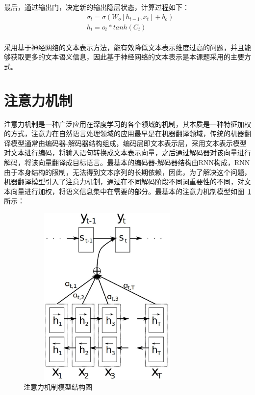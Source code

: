 最后，通过输出门，决定新的输出隐层状态，计算过程如下：
\begin{equation}
    \begin{aligned}
        & \sigma_t=\sigma(W_o[h_{t-1},x_t]+b_o) \\
        & h_t=o_t*tanh(C_t)\\
    \end{aligned}
\end{equation}

采用基于神经网络的文本表示方法，能有效降低文本表示维度过高的问题，并且能够获取更多的文本语义信息，因此基于神经网络的文本表示是本课题采用的主要方式。

\section{注意力机制}

注意力机制是一种广泛应用在深度学习的各个领域的机制，其本质是一种特征加权的方式，注意力在自然语言处理领域的应用最早是在机器翻译领域\cite{bahdanau2014neural}，传统的机器翻译模型通常由编码器-解码器结构组成，编码层即文本表示层，采用文本表示模型对文本进行编码，将输入语句转换成文本表示向量，之后通过解码器对该向量进行解码，将该向量翻译成目标语言。最基本的编码器-解码器结构由RNN构成，RNN由于本身结构的限制，无法得到文本序列的长期依赖，因此，为了解决这个问题，机器翻译模型引入了注意力机制，通过在不同解码阶段不同词重要性的不同，对文本向量进行加权，将语义信息集中在需要的部分。最基本的注意力机制模型如图~\ref{fig:attention}所示：
\begin{figure}[htb]
    \centering
    \includegraphics[width=9cm,height=9cm, clip=true]{./sources/rel_attention.eps}
    \vspace{-10pt}
    \caption{\label{fig:attention} 注意力机制模型结构图}
    \vspace{-5pt}
\end{figure}

